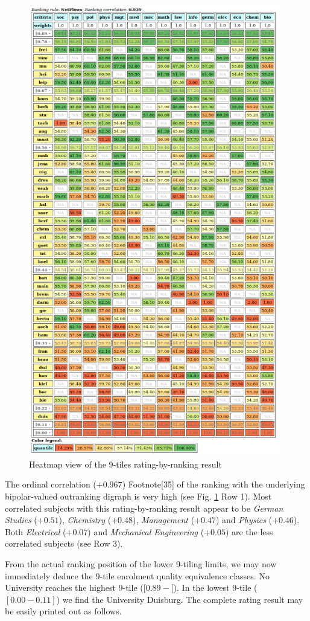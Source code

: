 \begin{figure}[h]
\includegraphics[width=11cm]{Figures/nineTilingResult.png}
\caption{Heatmap view of the 9-tiles rating-by-ranking result}
\label{fig:14.4}       %
\end{figure}
The ordinal correlation ($+0.967$) Footnote[35] of the \Copeland ranking with the underlying bipolar-valued outranking digraph is very high (see Fig. \ref{fig:14.4} Row 1). Most correlated subjects with this rating-by-ranking result appear to be \emph{German Studies} ($+0.51$), \emph{Chemistry} ($+0.48$), \emph{Management} ($+0.47$) and \emph{Physics} ($+0.46$). Both \emph{Electrical} ($+0.07$) and \emph{Mechanical Engineering} ($+0.05$) are the less correlated subjects (see Row 3).

From the actual ranking position of the lower 9-tiling limits, we may now immediately deduce the 9-tile enrolment quality equivalence classes. No University reaches the highest 9-tile ($[0.89 - [$). In the lowest 9-tile ($[0.00- 0.11]$) we find the University Duisburg. The complete rating result may be easily printed out as follows.

